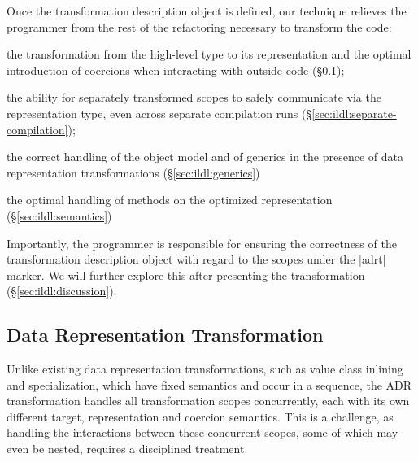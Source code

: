 Once the transformation description object is defined, our technique relieves the programmer from the rest of the refactoring necessary to transform the code:

\begin{compactitem}
\item the transformation from the high-level type to its representation and the optimal introduction of coercions when interacting with outside code (\S\ref{sec:ildl:ldl});
\item the ability for separately transformed scopes to safely communicate via the representation type, even across separate compilation runs (\S\ref{sec:ildl:separate-compilation});
\item the correct handling of the object model and of generics in the presence of data representation transformations (\S\ref{sec:ildl:generics})
\item the optimal handling of methods on the optimized representation (\S\ref{sec:ildl:semantics})
\end{compactitem}

Importantly, the programmer is responsible for ensuring the correctness of the transformation description object with regard to the scopes under the |adrt| marker. We will further explore this after presenting the transformation (\S\ref{sec:ildl:discussion}).












\subsection{Data Representation Transformation}
\label{sec:ildl:ldl}

Unlike existing data representation transformations, such as value class inlining and specialization, which have fixed semantics and occur in a sequence, the ADR transformation handles all transformation scopes concurrently, each with its own different target, representation and coercion semantics. This is a challenge, as handling the interactions between these concurrent scopes, some of which may even be nested, requires a disciplined treatment.



